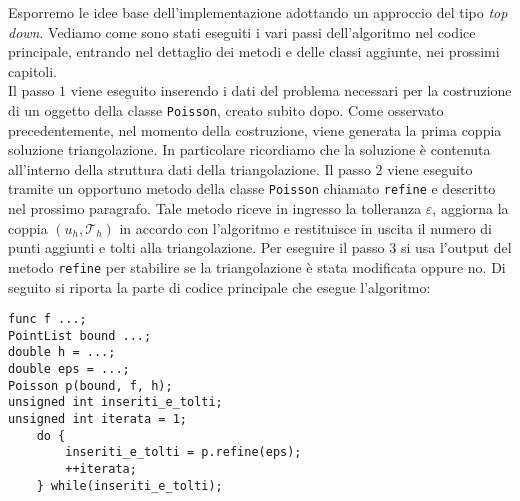 \documentclass[a4paper,10pt,twoside]{amsart}
\theoremstyle{remark}
\theoremstyle{definition}
\renewcommand{\epsilon}{\varepsilon}
\renewcommand{\tt}{\texttt}
\begin{document}
Esporremo le idee base dell'implementazione adottando un approccio del tipo {\it top down}. Vediamo come sono stati eseguiti i vari passi dell'algoritmo nel codice principale, entrando nel dettaglio dei metodi e delle classi aggiunte, nei prossimi capitoli.\\
Il passo $1$ viene eseguito inserendo i dati del problema necessari per la costruzione di un oggetto della classe \tt{Poisson}, creato subito dopo. Come osservato precedentemente, nel momento della costruzione, viene generata la prima coppia soluzione triangolazione. In particolare ricordiamo che la soluzione è contenuta all'interno della struttura dati della triangolazione. Il passo $2$ viene eseguito tramite un opportuno metodo della classe \tt{Poisson} chiamato \tt{refine} e descritto nel prossimo paragrafo. Tale metodo riceve in ingresso la tolleranza $\epsilon$, aggiorna la coppia $(u_h, \mathcal{T}_h)$ in accordo con l'algoritmo e restituisce in uscita il numero di punti aggiunti e tolti alla triangolazione. Per eseguire il passo $3$ si usa l'output del metodo \tt{refine} per stabilire se la triangolazione è stata modificata oppure no. Di seguito si riporta la parte di codice principale che esegue l'algoritmo:
\begin{lstlisting}
func f ...;
PointList bound ...;
double h = ...;
double eps = ...;
Poisson p(bound, f, h);
unsigned int inseriti_e_tolti;
unsigned int iterata = 1;
	do {
		inseriti_e_tolti = p.refine(eps);
		++iterata;
	} while(inseriti_e_tolti);
\end{lstlisting}
\end{document}
